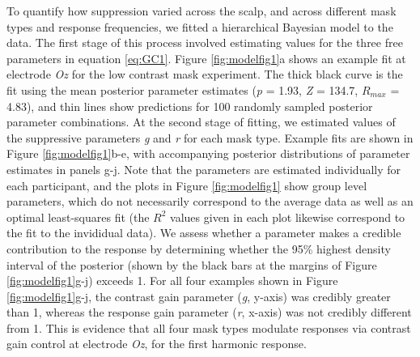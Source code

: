 \documentclass[]{article}
\begin{document}
To quantify how suppression varied across the scalp, and across different mask types and response frequencies, we fitted a hierarchical Bayesian model to the data. The first stage of this process involved estimating values for the three free parameters in equation \eqref{eq:GC1}. Figure \ref{fig:modelfig1}a shows an example fit at electrode \emph{Oz} for the low contrast mask experiment. The thick black curve is the fit using the mean posterior parameter estimates (\emph{p} = 1.93, \emph{Z} = 134.7, \(R_{max}\) = 4.83), and thin lines show predictions for 100 randomly sampled posterior parameter combinations. At the second stage of fitting, we estimated values of the suppressive parameters \emph{g} and \emph{r} for each mask type. Example fits are shown in Figure \ref{fig:modelfig1}b-e, with accompanying posterior distributions of parameter estimates in panels g-j. Note that the parameters are estimated individually for each participant, and the plots in Figure \ref{fig:modelfig1} show group level parameters, which do not necessarily correspond to the average data as well as an optimal least-squares fit (the \(R^2\) values given in each plot likewise correspond to the fit to the invididual data). We assess whether a parameter makes a credible contribution to the response by determining whether the 95\% highest density interval of the posterior (shown by the black bars at the margins of Figure \ref{fig:modelfig1}g-j) exceeds 1. For all four examples shown in Figure \ref{fig:modelfig1}g-j, the contrast gain parameter (\emph{g}, y-axis) was credibly greater than 1, whereas the response gain parameter (\emph{r}, x-axis) was not credibly different from 1. This is evidence that all four mask types modulate responses via contrast gain control at electrode \emph{Oz}, for the first harmonic response.
\end{document}
